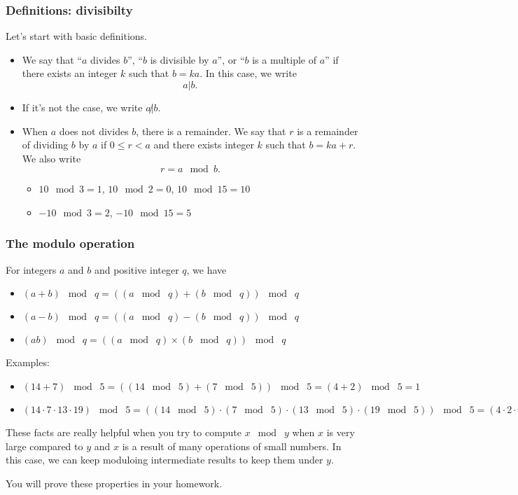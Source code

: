\begin{frame}\frametitle{Definitions: divisibilty}
  Let's start with basic definitions.
  \begin{itemize}
  \item We say that ``$a$ divides $b$'', ``$b$ is divisible by $a$'',
    or ``$b$ is a multiple of $a$'' if there exists an integer $k$
    such that $b = ka$.  In this case, we write \[a|b.\]
  \item If it's not the case, we write $a\not| b$.
  \item When $a$ does not divides $b$, there is a remainder.  We say
    that $r$ is a remainder of dividing $b$ by $a$ if $0\leq r<a$ and
    there exists integer $k$ such that $b = ka + r$.  We also write
    \[ r = a\mod b.\]
    \begin{itemize}
    \item $10\mod 3 = 1$, $10\mod 2 = 0$, $10\mod 15=10$
    \item $-10\mod 3 = 2$, $-10\mod 15=5$
    \end{itemize}
  \end{itemize}
\end{frame}

\begin{frame}\frametitle{The modulo operation}
  \begin{tcolorbox}
    For integers $a$ and $b$ and positive integer $q$, we have
    \begin{itemize}
    \item $(a+b)\;\bmod\;q = ((a\;\bmod\;q) + (b\;\bmod\;q))\;\bmod\; q$
    \item $(a-b)\;\bmod\;q = ((a\;\bmod\;q) - (b\;\bmod\;q))\;\bmod\; q$
    \item $(ab)\;\bmod\;q = ((a\;\bmod\;q) \times (b\;\bmod\;q))\;\bmod\; q$
    \end{itemize}
  \end{tcolorbox}

  Examples:
  \begin{itemize}
    \item $(14 + 7)\;\bmod\; 5 = ((14\;\bmod\;5) + (7\;\bmod\;5))\;\bmod\;5 = (4+2)\;\bmod\;5 = 1$
    \item $(14\cdot 7\cdot 13\cdot 19)\;\bmod\; 5 = ((14\;\bmod\;5)\cdot(7\;\bmod\;5)\cdot(13\;\bmod\;5)\cdot(19\;\bmod\;5))\;\bmod\;5 = (4\cdot 2\cdot 3\cdot 4)\;\bmod\;5 = 96\;\bmod\;5=1$
  \end{itemize}

  {\small These facts are really helpful when you try to compute
    $x\;\bmod\; y$ when $x$ is very large compared to $y$ and $x$ is a
    result of many operations of small numbers.  In this case, we can
    keep moduloing intermediate results to keep them under $y$.
  
    You will prove these properties in your homework.
  }
\end{frame}

